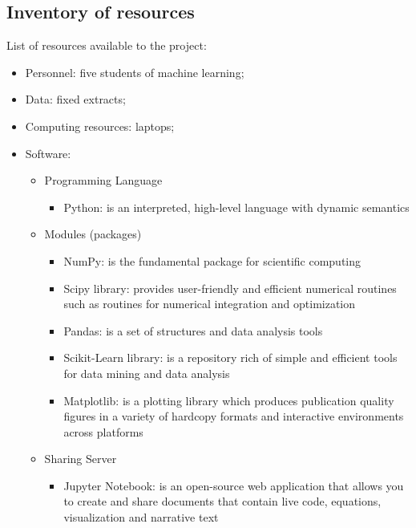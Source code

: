 \subsection{Inventory of resources}
List of resources available to the project:
\begin{itemize}
\item Personnel: five students of machine learning; 
\item Data: fixed extracts;
\item Computing resources: laptops;
\item Software:
   \begin{itemize}
       \item Programming Language
             \begin{itemize}
                 \item Python: is an interpreted, high-level language with 
dynamic semantics 
             \end{itemize}
        \item Modules (packages)
             \begin{itemize}
                 \item NumPy: is the fundamental package for scientific computing
                 \item Scipy library: provides user-friendly and efficient numerical routines
such as routines for numerical integration and optimization
                 \item Pandas: is a set of structures and data analysis tools
                 \item Scikit-Learn library: is a repository rich of simple and efficient
tools for data mining and data analysis
                 \item Matplotlib: is a plotting library which produces publication
quality figures in a variety of hardcopy formats and interactive
environments across platforms
             \end{itemize}
        \item Sharing Server
             \begin{itemize}
                 \item Jupyter Notebook: is an open-source web application that allows
you to create and share documents that contain live code,
equations, visualization and narrative text
             \end{itemize}
   \end{itemize}
\end{itemize}

